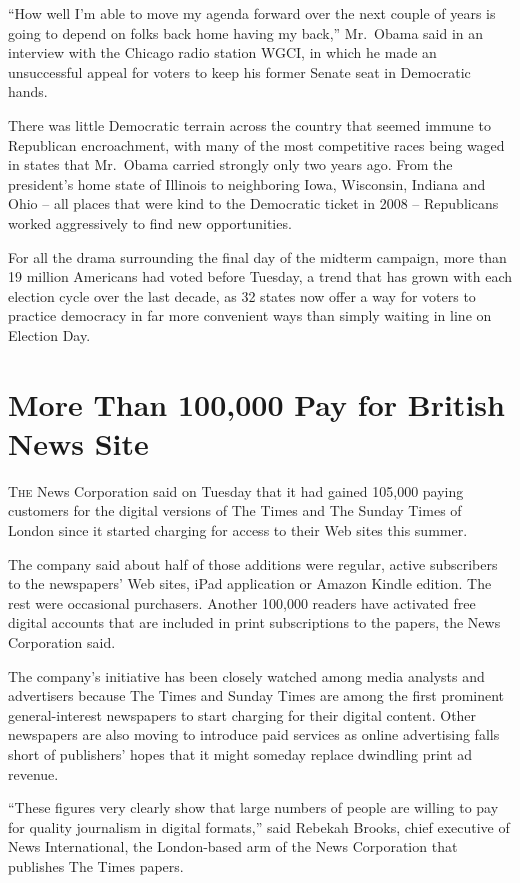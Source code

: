 ﻿\documentclass[12pt]{article}
\begin{document}
``How well I'm able to move my agenda forward over the next couple of years is going to depend on
folks back home having my back,'' Mr.~Obama said in an interview with the Chicago radio station
WGCI, in which he made an unsuccessful appeal for voters to keep his former Senate seat in
Democratic hands.

There was little Democratic terrain across the country that seemed immune to Republican
encroachment, with many of the most competitive races being waged in states that Mr.~Obama carried
strongly only two years ago. From the president's home state of Illinois to neighboring Iowa,
Wisconsin, Indiana and Ohio -- all places that were kind to the Democratic ticket in 2008 --
Republicans worked aggressively to find new opportunities.

For all the drama surrounding the final day of the midterm campaign, more than 19 million Americans
had voted before Tuesday, a trend that has grown with each election cycle over the last decade, as
32 states now offer a way for voters to practice democracy in far more convenient ways than simply
waiting in line on Election Day.

\section{More Than 100,000 Pay for British News Site}

\lettrine{T}{he} News Corporation said on Tuesday that it had gained 105,000
paying customers for the digital versions of The Times and The Sunday Times of London since it
started charging for access to their Web sites this summer.

The company said about half of those additions were regular, active subscribers to the newspapers'
Web sites, iPad application or Amazon Kindle edition. The rest were occasional purchasers. Another
100,000 readers have activated free digital accounts that are included in print subscriptions to the
papers, the News Corporation said.

The company's initiative has been closely watched among media analysts and advertisers because The
Times and Sunday Times are among the first prominent general-interest newspapers to start charging
for their digital content. Other newspapers are also moving to introduce paid services as online
advertising falls short of publishers' hopes that it might someday replace dwindling print ad
revenue.

``These figures very clearly show that large numbers of people are willing to pay for quality
journalism in digital formats,'' said Rebekah Brooks, chief executive of News International, the
London-based arm of the News Corporation that publishes The Times papers.
\end{document}
